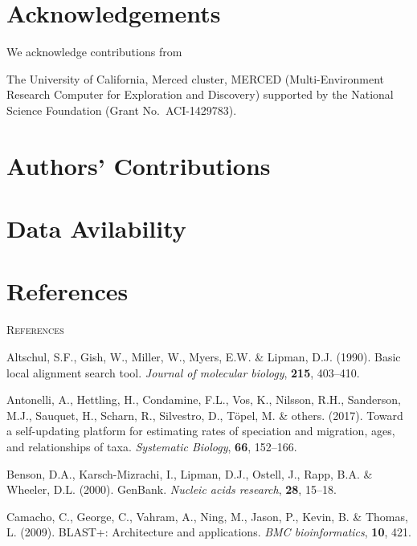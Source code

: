 \documentclass[]{article}
\begin{document}
\hypertarget{acknowledgements}{%
\section{Acknowledgements}\label{acknowledgements}}

We acknowledge contributions from

The University of California, Merced cluster, MERCED (Multi-Environment Research Computer for Exploration and Discovery) supported by the National Science Foundation (Grant No.~ACI-1429783).

\hypertarget{authors-contributions}{%
\section{Authors' Contributions}\label{authors-contributions}}

\hypertarget{data-avilability}{%
\section{Data Avilability}\label{data-avilability}}

\hypertarget{references}{%
\section{References}\label{references}}

\newpage
\begin{center}
\textsc{References}
\end{center}

\hypertarget{refs}{}
\leavevmode\hypertarget{ref-altschul1990basic}{}%
Altschul, S.F., Gish, W., Miller, W., Myers, E.W. \& Lipman, D.J. (1990). Basic local alignment search tool. \emph{Journal of molecular biology}, \textbf{215}, 403--410.

\leavevmode\hypertarget{ref-antonelli2017toward}{}%
Antonelli, A., Hettling, H., Condamine, F.L., Vos, K., Nilsson, R.H., Sanderson, M.J., Sauquet, H., Scharn, R., Silvestro, D., Töpel, M. \& others. (2017). Toward a self-updating platform for estimating rates of speciation and migration, ages, and relationships of taxa. \emph{Systematic Biology}, \textbf{66}, 152--166.

\leavevmode\hypertarget{ref-benson2000genbank}{}%
Benson, D.A., Karsch-Mizrachi, I., Lipman, D.J., Ostell, J., Rapp, B.A. \& Wheeler, D.L. (2000). GenBank. \emph{Nucleic acids research}, \textbf{28}, 15--18.

\leavevmode\hypertarget{ref-camacho2009blast}{}%
Camacho, C., George, C., Vahram, A., Ning, M., Jason, P., Kevin, B. \& Thomas, L. (2009). BLAST+: Architecture and applications. \emph{BMC bioinformatics}, \textbf{10}, 421.
\end{document}
